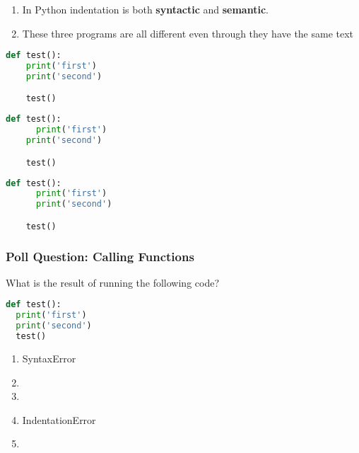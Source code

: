 \documentclass{beamer}
\begin{document}
%
%
\begin{frame}[fragile]
  \centering
  \begin{enumerate}[A]
    \item In Python indentation is both \textbf{syntactic} and \textbf{semantic}.
    \item These three programs are all different even through they have the same text
  \end{enumerate}
  \vfill
  \begin{minipage}{0.29\textwidth}
    \centering
    \begin{lstlisting}[language=Python, autogobble]
    def test():
    print('first')
    print('second')

    test()
    \end{lstlisting}
  \end{minipage}
  \hfill
  \begin{minipage}{0.29\textwidth}
    \centering
    \begin{lstlisting}[language=Python, autogobble]
    def test():
      print('first')
    print('second')

    test()
    \end{lstlisting}
  \end{minipage}
  \hfill
  \begin{minipage}{0.29\textwidth}
    \centering
    \begin{lstlisting}[language=Python, autogobble]
    def test():
      print('first')
      print('second')

    test()
    \end{lstlisting}
  \end{minipage}
\end{frame}
%
%
\begin{frame}[fragile]
  \frametitle{Poll Question: Calling Functions}
  What is the result of running the following code?
  \begin{lstlisting}[language=Python, autogobble]
  def test():
  print('first')
  print('second')
  test()
  \end{lstlisting}
  \vfill
  \begin{enumerate}[A]
    \item SyntaxError
    \item {}
    \item {}
    \item IndentationError
    \item {} %
  \end{enumerate}
\end{frame}
\end{document}
